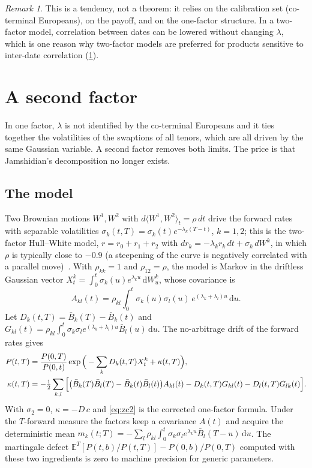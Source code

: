 \documentclass[11pt,a4paper]{article}
\theoremstyle{definition}
\theoremstyle{remark}
\newtheorem{remark}{Remark}
\newcommand{\E}{\mathbb{E}}
\newcommand{\Bb}{\bar B}
\newcommand{\dd}{\,\mathrm{d}}
\begin{document}
\begin{remark}
This is a tendency, not a theorem: it relies on the calibration set (co-terminal Europeans), on the payoff, and on the
one-factor structure. In a two-factor model, correlation between dates can be lowered without changing $\lambda$, which is one
reason why two-factor models are preferred for products sensitive to inter-date correlation (\cref{sec:2f}).
\end{remark}

\section{A second factor}\label{sec:2f}
In one factor, $\lambda$ is not identified by the co-terminal Europeans and it ties together the volatilities of the swaptions of all
tenors, which are all driven by the same Gaussian variable. A second factor removes both limits. The price is that Jamshidian's
decomposition no longer exists.

\subsection{The model}
Two Brownian motions $W^1,W^2$ with $d\langle W^1,W^2\rangle_t=\rho\,dt$ drive the forward rates with separable volatilities
$\sigma_k(t,T)=\sigma_k(t)e^{-\lambda_k(T-t)}$, $k=1,2$; this is the two-factor Hull--White model, $r=r_0+r_1+r_2$ with
$dr_k=-\lambda_kr_k\,dt+\sigma_k\,dW^k$, in which $\rho$ is typically close to $-0.9$ (a steepening of the curve is negatively
correlated with a parallel move)~\cite{les}. With $\rho_{kk}=1$ and $\rho_{12}=\rho$, the model is Markov in the driftless Gaussian
vector $X^k_t=\int_0^t\sigma_k(u)e^{\lambda_ku}\dd W^k_u$, whose covariance is
\[
A_{kl}(t)=\rho_{kl}\int_0^t\sigma_k(u)\sigma_l(u)\,e^{(\lambda_k+\lambda_l)u}\dd u .
\]
Let $D_k(t,T)=\Bb_k(T)-\Bb_k(t)$ and $G_{kl}(t)=\rho_{kl}\int_0^t\sigma_k\sigma_le^{(\lambda_k+\lambda_l)u}\Bb_l(u)\dd u$. The no-arbitrage drift
of the forward rates gives
\begin{align}
P(t,T)&=\frac{P(0,T)}{P(0,t)}\exp\Big(-\sum_kD_k(t,T)X^k_t+\kappa(t,T)\Big),\notag\\
\kappa(t,T)&=-\tfrac12\sum_{k,l}\Big[\big(\Bb_k(T)\Bb_l(T)-\Bb_k(t)\Bb_l(t)\big)A_{kl}(t)-D_k(t,T)G_{kl}(t)-D_l(t,T)G_{lk}(t)\Big].
\label{eq:zc2}
\end{align}
With $\sigma_2=0$, $\kappa=-D\,c$ and \eqref{eq:zc2} is the corrected one-factor formula. Under the $T$-forward measure the factors keep a
covariance $A(t)$ and acquire the deterministic mean $m_k(t;T)=-\sum_l\rho_{kl}\int_0^t\sigma_k\sigma_le^{\lambda_ku}\Bb_l(T-u)\dd u$. The martingale
defect $\E^T[P(t,b)/P(t,T)]-P(0,b)/P(0,T)$ computed with these two ingredients is zero to machine precision for generic parameters.
\end{document}
